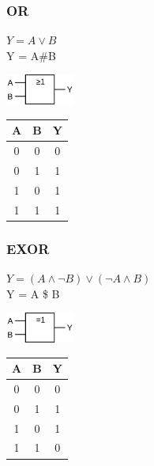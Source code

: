\subsubsection{OR}
\begin{center}
    \begin{minipage}{0.55\linewidth}
		$Y = A \lor B$ \\
		Y = A\#B
        \begin{center}
		\includegraphics[height = 10mm]{images/or.png}		
        \end{center}
    \end{minipage}
    \hfill
    \begin{minipage}{0.35\linewidth}
        \begin{tabular}{|c c|c|}
            \hline
            A & B & Y\\
            \hline
            0 & 0 & 0\\
            0 & 1 & 1\\
            1 & 0 & 1\\
            1 & 1 & 1\\
            \hline
        \end{tabular}
    \end{minipage}
\end{center}

\subsubsection{EXOR}
\begin{center}
    \begin{minipage}{0.55\linewidth}
		$Y = (A \land \neg B) \lor (\neg A \land B)$ \\
		Y = A \$ B
        \begin{center}
		\includegraphics[height = 10mm]{images/xor.png}		
        \end{center}
    \end{minipage}
    \hfill
    \begin{minipage}{0.35\linewidth}
	\begin{tabular}{|c c|c|}
            \hline
            A & B & Y\\
            \hline
            0 & 0 & 0\\
            0 & 1 & 1\\
            1 & 0 & 1\\
	    1 & 1 & 0\\
            \hline
  	  \end{tabular}
    \end{minipage}
\end{center}

